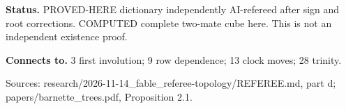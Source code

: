 \documentclass[10pt,a4paper]{amsart}
\begin{document}
\textbf{Status.} PROVED-HERE dictionary independently AI-refereed after sign and root corrections. COMPUTED complete two-mate cube here. This is not an independent existence proof.

\textbf{Connects to.} 3 first involution; 9 row dependence; 13 clock moves; 28 trinity.

{\footnotesize\raggedright Sources: research/\allowbreak{}2026-11-14\_fable\_referee-topology/\allowbreak{}REFEREE.md, part d;\allowbreak{} papers/\allowbreak{}barnette\_trees.pdf, Proposition 2.1.\par}
\end{document}
